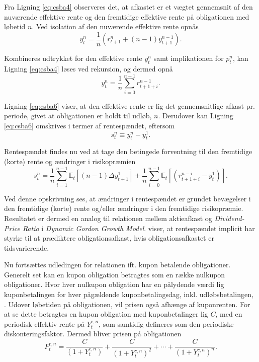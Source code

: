 \documentclass[
  a4paper,
  oneside]{memoir}
\begin{document}
Fra Ligning \eqref{eq:csba4} observeres det, at afkastet er et vægtet gennemsnit af den nuværende effektive rente og den fremtidige effektive rente på obligationen med løbetid \(n\). Ved isolation af den nuværende effektive rente opnås
\begin{equation}
y_t^n = \frac{1}{n} \left(r_{t+1}^n + (n-1) y_{t+1}^{n-1}\right). \label{eq:csba5}
\end{equation}

Kombineres udtrykket for den effektive rente \(y_t^n\) samt implikationen for \(p_t^n\), kan Ligning \eqref{eq:csba4} løses ved rekursion, og dermed opnå
\begin{equation}
y_t^n = \frac{1}{n} \sum_{i=0}^{n-1} r_{t+1+i}^{n-1}. \label{eq:csba6}
\end{equation}

Ligning \eqref{eq:csba6} viser, at den effektive rente er lig det gennemsnitlige afkast pr. periode, givet at obligationen er holdt til udløb, \(n\). Derudover kan Ligning \eqref{eq:csba6} omskrives i termer af rentespændet, eftersom
\begin{equation}
s_t^n\equiv y_t^n - y_t^1. \label{eq:csba7}
\end{equation}

Rentespændet findes nu ved at tage den betingede forventning til den fremtidige (korte) rente og ændringer i risikopræmien
\begin{equation}
s_t^n=\frac{1}{n} \sum_{i=1}^{n-1} \mathbb{E}_t\left[(n-1)\Delta y_{t+1}^1\right] + \frac{1}{n}\sum_{i=0}^{n-1}\mathbb{E}_t\left[(r_{t+1+i}^{n-i}-y_t^1)\right]. \label{eq:csba8}
\end{equation}

Ved denne opskrivning ses, at ændringer i rentespændet er grundet bevægelser i den fremtidige (korte) rente og/eller ændringer i den fremtidige risikopræmie. Resultatet er dermed en analog til relationen mellem aktieafkast og \emph{Dividend-Price Ratio} i \emph{Dynamic Gordon Growth Model}. \citep{Fama1987} viser, at rentespændet implicit har styrke til at prædiktere obligationsafkast, hvis obligationsafkastet er tidsvarierende.

Nu fortsættes udledingen for relationen ift. kupon betalende obligationer. Generelt set kan en kupon obligation betragtes som en række nulkupon obligationer. Hvor hver nulkupon obligation har en pålydende værdi lig kuponbetalingen for hver pågældende kuponbetalingsdag, inkl. udløbsbetalingen, \citep{Campbell1997}. Udover løbetiden på obligationen, vil prisen også afhænge af kuponrenten. For at se dette betragtes en kupon obligation med kuponbetalinger lig \(C\), med en periodisk effektiv rente på \(Y_t^{c,n}\), som samtidig defineres som den periodiske diskonteringsfaktor. Dermed bliver prisen på obligationen
\begin{equation}
P_t^{c,n}=\frac{C}{(1+Y_t^{c,n})}+\frac{C}{(1+Y_t^{c,n})^2}+\cdots+\frac{C}{(1+Y_t^{c,n})^n}.  \label{eq:csba9}
\end{equation}
\end{document}
